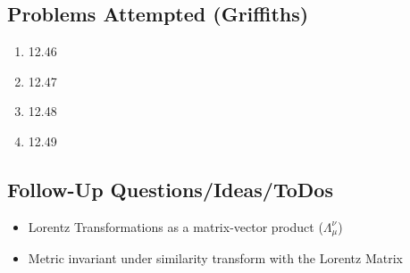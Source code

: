 \subsection*{Problems Attempted (Griffiths)}
\begin{enumerate}
    \item 12.46
    \item 12.47
    \item 12.48
    \item 12.49
\end{enumerate}

\subsection*{Follow-Up Questions/Ideas/ToDos}
\begin{itemize}
    \item Lorentz Transformations as a matrix-vector product (\(\Lambda _\mu ^\nu\)) 
    \item Metric invariant under similarity transform with the Lorentz Matrix
\end{itemize}
